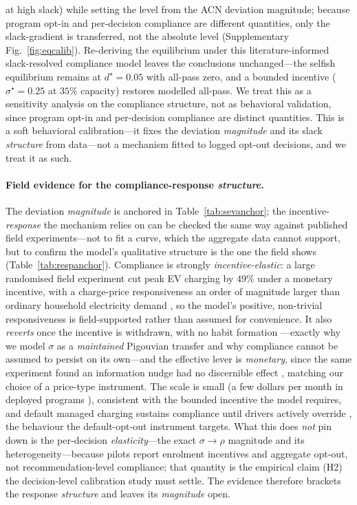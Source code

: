 \documentclass[12pt]{article}
\begin{document}
at high slack) while setting the level from the ACN deviation magnitude; because program
opt-in and per-decision compliance are different quantities, only the slack-gradient is
transferred, not the absolute level (Supplementary Fig.~\ref{fig:eqcalib}). Re-deriving the
equilibrium under this literature-informed slack-resolved compliance model leaves the
conclusions unchanged---the selfish equilibrium remains at $d^\star=0.05$ with all-pass
zero, and a bounded incentive ($\sigma^\star=0.25$ at $35\%$ capacity) restores modelled all-pass.
We treat this as a sensitivity analysis on the compliance structure, not as behavioral
validation, since program opt-in and per-decision compliance are distinct quantities. This is a soft
behavioral calibration---it fixes the deviation \emph{magnitude} and its slack
\emph{structure} from data---not a mechanism fitted to logged opt-out decisions, and we
treat it as such.

\paragraph{Field evidence for the compliance-response \emph{structure}.} The deviation \emph{magnitude} is anchored in Table~\ref{tab:sevanchor}; the incentive-\emph{response} the mechanism relies on can be checked the same way against published field experiments---not to fit a curve, which the aggregate data cannot support, but to confirm the model's qualitative structure is the one the field shows (Table~\ref{tab:respanchor}). Compliance is strongly \emph{incentive-elastic}: a large randomised field experiment cut peak EV charging by $49\%$ under a monetary incentive, with a charge-price responsiveness an order of magnitude larger than ordinary household electricity demand \cite{bailey2025fieldexp}, so the model's positive, non-trivial responsiveness is field-supported rather than assumed for convenience. It also \emph{reverts} once the incentive is withdrawn, with no habit formation \cite{bailey2025fieldexp}---exactly why we model $\sigma$ as a \emph{maintained} Pigouvian transfer and why compliance cannot be assumed to persist on its own---and the effective lever is \emph{monetary}, since the same experiment found an information nudge had no discernible effect \cite{bailey2025fieldexp}, matching our choice of a price-type instrument. The scale is small (a few dollars per month in deployed programs \cite{alexeenko2023pilot}), consistent with the bounded incentive the model requires, and default managed charging sustains compliance until drivers actively override \cite{dudek2021electricnation}, the behaviour the default-opt-out instrument targets. What this does \emph{not} pin down is the per-decision \emph{elasticity}---the exact $\sigma\!\to\!\rho$ magnitude and its heterogeneity---because pilots report enrolment incentives and aggregate opt-out, not recommendation-level compliance; that quantity is the empirical claim (H2) the decision-level calibration study must settle. The evidence therefore brackets the response \emph{structure} and leaves its \emph{magnitude} open.
\end{document}
